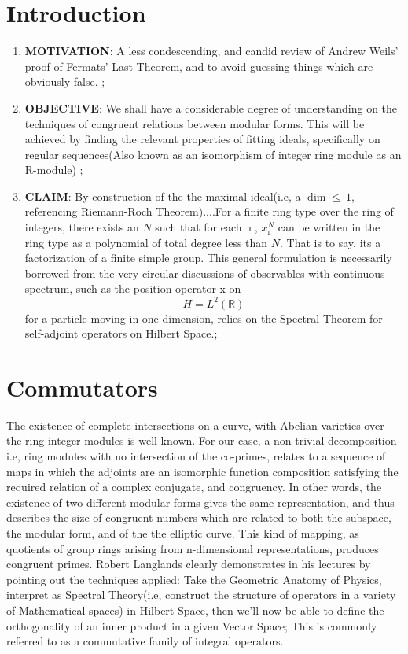 \documentclass[11pt,fancy]{elegantbook}
\begin{document}
\section{Introduction}

\begin{enumerate}
  \item \textbf{MOTIVATION}: A less condescending, and candid review of Andrew Weils' proof of Fermats' Last Theorem, and to avoid guessing things which are obviously false. ;
  \item \textbf{OBJECTIVE}: We shall have a considerable degree of understanding on the techniques of congruent relations between modular forms. This will be achieved by finding the relevant properties of fitting ideals, specifically on regular sequences(Also known as an isomorphism of integer ring module as an R-module) ;
  \item \textbf{CLAIM}: By construction of the the maximal ideal(i.e, a ${{\dim \le} \ {1}}$, referencing Riemann-Roch Theorem)....For a finite ring type over the ring of integers, there exists an $N$ such that for each ${\imath}$, ${x_{\imath}^N}$ can be written in the ring type as a polynomial of total degree less than $N$. That is to say, its a factorization of a finite simple group. This general formulation is necessarily borrowed from the very circular discussions of observables with continuous spectrum, such as the position operator x on 
  \begin{equation}
  H = {L}^2(\mathbb{R})
  \end{equation}
  for a particle moving in one dimension, relies on the Spectral Theorem for self-adjoint operators on Hilbert Space.;
\end{enumerate}

\section{Commutators}
The existence of complete intersections on a curve, with Abelian varieties over the ring integer modules is well known. For our case, a non-trivial decomposition i.e, ring modules with no intersection of the co-primes, relates to a sequence of maps in which the adjoints are an isomorphic function composition satisfying the required relation of a complex conjugate, and congruency.
In other words, the existence of two different modular forms gives the same representation, and thus describes the size of congruent numbers which are related to both the subspace, the modular form, and of the the elliptic curve.
This kind of mapping, as quotients of group rings arising from n-dimensional representations, produces congruent primes. Robert Langlands clearly demonstrates in his lectures by pointing out the techniques applied: Take the Geometric Anatomy of Physics, interpret as Spectral Theory(i.e, construct the structure of operators in a variety of Mathematical spaces) in Hilbert Space, then we'll now be able to define the orthogonality of an inner product in a given Vector Space; This is commonly referred to as a commutative family of integral operators.
\end{document}
